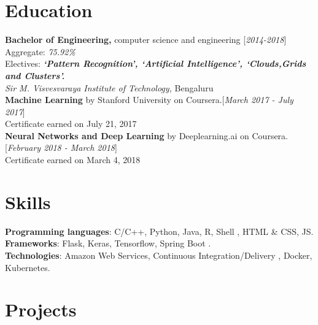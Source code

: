 \documentclass[10pt]{article}
\renewcommand{\textbf}[1]{{\bfseries\color{accent_darkest}#1}}
\begin{document}
\section*{Education} \textbf{Bachelor of Engineering,} computer science
and engineering \hfill \textcolor{grey_darker}{[\textit{2014-2018}]}\\
Aggregate: \textit{75.92\%}\\
Electives: \textbf{\textit{`Pattern Recognition', `Artificial Intelligence',
`Clouds,Grids and Clusters'.}}\\
\textit{Sir M. Visvesvaraya Institute of Technology,} Bengaluru
\medskip
\\
\textbf{Machine Learning} by Stanford University on Coursera.\hfill  \textcolor{grey_darker}{[\textit
{March 2017 - July 2017}]}\\
Certificate earned on July 21, 2017
\medskip\\ 
\textbf{Neural Networks and Deep Learning} by Deeplearning.ai on Coursera.\hfill  \textcolor{grey_darker}{[\textit
{February 2018 - March 2018}]}\\
Certificate earned on March 4, 2018 

\section*{Skills} 
\textbf{Programming languages}: C/C++, Python, Java, R, Shell , HTML \& CSS, JS.\\
\textbf{Frameworks}: Flask, Keras, Tensorflow, Spring Boot .\\
\textbf{Technologies}: Amazon Web Services, Continuous Integration/Delivery , Docker, Kubernetes. 

\section*{Projects}
\end{document}
